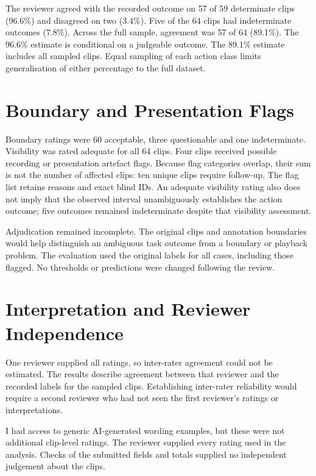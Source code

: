 The reviewer agreed with the recorded outcome on 57 of 59 determinate clips (96.6\%) and
disagreed on two (3.4\%). Five of the 64 clips had indeterminate outcomes (7.8\%).
Across the full sample, agreement was 57 of 64 (89.1\%). The 96.6\% estimate is
conditional on a judgeable outcome. The 89.1\% estimate includes all sampled clips.
Equal sampling of each action class limits generalisation of either percentage to the
full dataset.

\section{Boundary and Presentation Flags}

Boundary ratings were 60 acceptable, three questionable and one indeterminate.
Visibility was rated adequate for all 64 clips. Four clips received possible recording
or presentation artefact flags. Because flag categories overlap, their sum is not the
number of affected clips: ten unique clips require follow-up. The flag list retains
reasons and exact blind IDs. An adequate visibility rating also does not imply that the
observed interval unambiguously establishes the action outcome; five outcomes remained
indeterminate despite that visibility assessment.

Adjudication remained incomplete. The original clips and annotation boundaries would
help distinguish an ambiguous task outcome from a boundary or playback problem. The
evaluation used the original labels for all cases, including those flagged. No
thresholds or predictions were changed following the review.

\section{Interpretation and Reviewer Independence}

One reviewer supplied all ratings, so inter-rater agreement could not be estimated. The
results describe agreement between that reviewer and the recorded labels for the sampled
clips. Establishing inter-rater reliability would require a second reviewer who had not
seen the first reviewer's ratings or interpretations.

I had access to generic AI-generated wording examples, but these were not additional
clip-level ratings. The reviewer supplied every rating used in the analysis. Checks of
the submitted fields and totals supplied no independent judgement about the clips.
